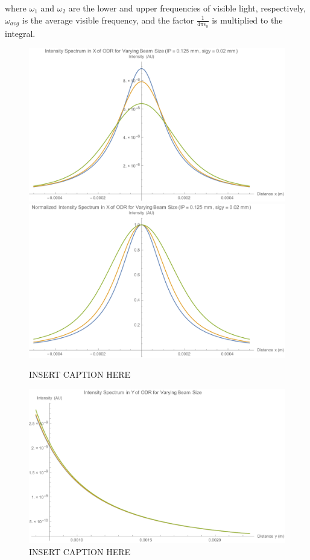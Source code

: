 \documentclass[12pt]{article}
\begin{document}
where $\omega_1$ and $\omega_2$ are the lower and upper frequencies of visible light, respectively, $\omega_{avg}$ is the average visible frequency, and the factor $\frac{1}{4 \pi \epsilon_0}$ is multiplied to the integral.

\begin{figure}
\begin{center}
\includegraphics[scale=0.5]{figures/ODR_IntensityX.PDF}
\includegraphics[scale=0.5]{figures/ODR_Norm_IntensityX.PDF}
\caption{INSERT CAPTION HERE}
\end{center}
\end{figure}

\begin{figure}
\begin{center}
\includegraphics[scale=0.5]{figures/ODR_IntensityY.PDF}
\caption{INSERT CAPTION HERE}
\end{center}
\end{figure}
\end{document}
